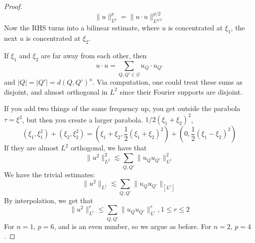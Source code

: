 \begin{proof}
    \begin{equation*}
        \|u\|_{L^p}^p=\|u\cdot u\|_{L^{p/2}}^{p/2}
    \end{equation*}
    Now the RHS turns into a bilinear estimate, where $u$ is concentrated at $\xi_1$, the next $u$ is concentrated at $\xi_2$.

    If $\xi_1$ and $\xi_2$ are far away from each other, then
    \begin{equation*}
        u\cdot u=\sum_{Q,Q'\in\mathcal{Q}}u_Q\cdot u_{Q'}
    \end{equation*}
    and $|Q|=|Q'|=d(Q,Q')^n$. Via computation, one could treat these sums as disjoint, and almost orthogonal in $L^2$ since their Fourier supports are disjoint.

    If you add two things of the same frequency up, you get outside the parabola $\tau=\xi^2$, but then you create a larger parabola. $1/2(\xi_1+\xi_2)^2$,
    \begin{equation*}
        (\xi_1, \xi_1^2)+(\xi_2, \xi_2^2)=(\xi_1+\xi_2, \frac{1}{2}(\xi_1+\xi_2)^2)+(0, \frac{1}{2}(\xi_1-\xi_2)^2)
    \end{equation*}
    If they are almost $L^2$ orthogonal, we have that
    \begin{equation*}
        \|u^2\|_{L^2}^2\lesssim \sum_{Q,Q'}\|u_Qu_{Q'}\|_{L^2}^2
    \end{equation*}
    We have the trivial estimates:
    \begin{equation*}
        \|u^2\|_{L^1}\lesssim \sum_{Q,Q'}\|u_Qu_{Q'}\|_[L^1]
    \end{equation*}
    By interpolation, we get that
    \begin{equation*}
        \|u^2\|_{L^r}^r\leq\sum_{Q,Q'}\|u_Qu_{Q'}\|_{L^r}^r, 1\leq r\leq 2
    \end{equation*}
    For $n=1$, $p=6$, and is an even number, so we argue as before. For $n=2$, $p=4$.


\end{proof}
